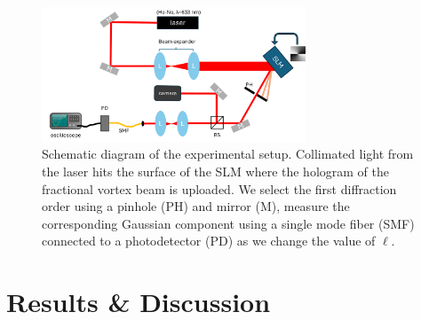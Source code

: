 \documentclass[10pt,a4paper,twoside]{article}
\renewcommand{\l}{\ell}
\begin{document}

% 


\begin{figure}[h!]
    \centering
    \includegraphics[width=0.7\textwidth]{setup.png}
    \caption{Schematic diagram of the experimental setup. Collimated light from the laser hits the surface of the SLM where the hologram of the fractional vortex beam is uploaded. We select the first diffraction order using a pinhole (PH) and mirror (M),  measure the corresponding Gaussian component using a single mode fiber (SMF) connected to a photodetector (PD) as we change the value of $\l$. } 
    \label{fig:setup}
\end{figure}

\section{Results \& Discussion}\label{sec:rnd}
\end{document}
